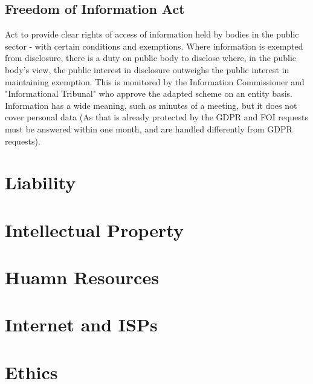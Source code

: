 \subsection{Freedom of Information Act} Act to provide clear rights of access of information held by bodies in the public sector - with certain conditions and exemptions. Where information is exempted from disclosure, there is a duty on public body to disclose where, in the public body's view, the public interest in disclosure outweighs the public interest in maintaining exemption. This is monitored by the Information Commissioner and "Informational Tribunal" who approve the adapted scheme on an entity basis. Information has a wide meaning, such as minutes of a meeting, but it does not cover personal data (As that is already protected by the GDPR and FOI requests must be answered within one month, and are handled differently from GDPR requests).
\section{Liability}
\section{Intellectual Property}
\section{Huamn Resources}
\section{Internet and ISPs}
\section{Ethics}